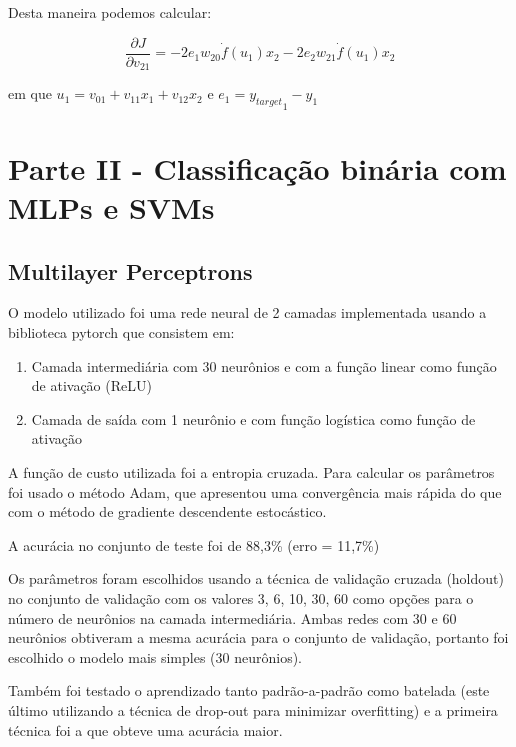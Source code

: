 \documentclass[a4paper, 12pt]{article}
\begin{document}
Desta maneira podemos calcular:

\[
    \frac{\partial J}{\partial v_{21}} = -2e_1w_{20}\dot{f}(u_1 ) x_2 - 2e_2w_{21}\dot{f}(u_1) x_2
\]

\vspace{1em}
em que $u_1 = v_{01} + v_{11}x_1 + v_{12}x_2$ e $e_1 = {y_{target}}_1 - y_1$

\section*{Parte II - Classificação binária com MLPs e SVMs}

\subsection*{Multilayer Perceptrons}

O modelo utilizado foi uma rede neural de 2 camadas implementada usando a biblioteca pytorch que consistem em:
\begin{enumerate}
\item
    Camada intermediária com 30 neurônios e com a função linear como função de ativação (ReLU)
\item
    Camada de saída com 1 neurônio e com função logística como função de ativação 
\end{enumerate}

A função de custo utilizada foi a entropia cruzada.
Para calcular os parâmetros foi usado o método Adam, que apresentou uma convergência mais rápida do que com o método de gradiente descendente estocástico.

A acurácia no conjunto de teste foi de 88,3\% (erro = 11,7\%)

Os parâmetros foram escolhidos usando a técnica de validação cruzada (holdout) no conjunto de validação com os valores 3, 6, 10, 30, 60 como opções para o número de neurônios na camada intermediária. Ambas redes com 30 e 60 neurônios obtiveram a mesma acurácia para o conjunto de validação, portanto foi escolhido o modelo mais simples (30 neurônios).

Também foi testado o aprendizado tanto padrão-a-padrão como batelada (este último utilizando a técnica de drop-out para minimizar overfitting) e a primeira técnica foi a que obteve uma acurácia maior.
\end{document}
